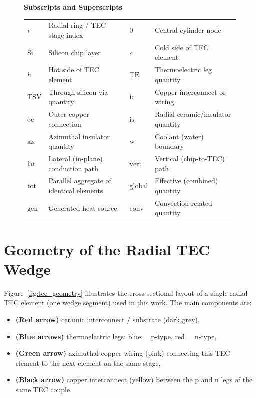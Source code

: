 \documentclass[conference]{IEEEtran}
\begin{document}
\begin{figure}[!t]
{{  \vspace{4pt}
  	\textbf{Subscripts and Superscripts}\\[4pt]
  \begin{tabular}{p{}p{}p{}p{}}
    $i$ & Radial ring / TEC stage index & $0$ & Central cylinder node \\
    $\text{Si}$ & Silicon chip layer & $c$ & Cold side of TEC element \\
    $h$ & Hot side of TEC element & $\text{TE}$ & Thermoelectric leg quantity \\
    $\text{TSV}$ & Through-silicon via quantity & $\text{ic}$ & Copper interconnect or wiring \\
    $\text{oc}$ & Outer copper connection & $\text{is}$ & Radial ceramic/insulator quantity \\
    $\text{az}$ & Azimuthal insulator quantity & $\text{w}$ & Coolant (water) boundary \\
    $\text{lat}$ & Lateral (in-plane) conduction path & $\text{vert}$ & Vertical (chip-to-TEC) path \\
    $\text{tot}$ & Parallel aggregate of identical elements & $\text{global}$ & Effective (combined) quantity \\
    $\text{gen}$ & Generated heat source & $\text{conv}$ & Convection-related quantity \\
  \end{tabular}
  }}
  \label{fig:nomenclature_box}
\end{figure}

\section{Geometry of the Radial TEC Wedge}

Figure~\ref{fig:tec_geometry} illustrates the cross-sectional layout of a single radial TEC element (one wedge segment) used in this work. The main components are:
\begin{itemize}
	\item\textbf{(Red arrow)} ceramic interconnect / substrate (dark grey),
	\item\textbf{(Blue arrows)} thermoelectric legs: blue = p-type, red = n-type,
	\item\textbf{(Green arrow)} azimuthal copper wiring (pink) connecting this TEC element to the next element on the same stage,
	\item\textbf{(Black arrow)} copper interconnect (yellow) between the p and n legs of the same TEC couple.
\end{itemize}
\end{document}
